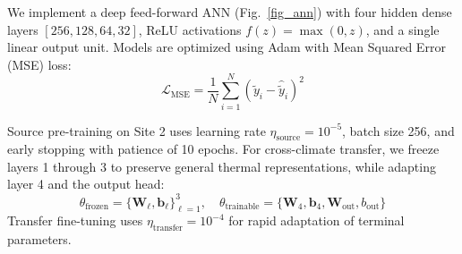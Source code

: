 \documentclass[conference]{IEEEtran}
\begin{document}
We implement a deep feed-forward ANN (Fig.~\ref{fig_ann}) with four hidden dense layers $[256, 128, 64, 32]$, ReLU activations $f(z) = \max(0, z)$, and a single linear output unit. Models are optimized using Adam with Mean Squared Error (MSE) loss:
\begin{equation}
\mathcal{L}_{\text{MSE}} = \frac{1}{N}\sum_{i=1}^{N} (\tilde{y}_i - \hat{\tilde{y}}_i)^2
\label{eq_mse}
\end{equation}

Source pre-training on Site 2 uses learning rate $\eta_{\text{source}} = 10^{-5}$, batch size 256, and early stopping with patience of 10 epochs. For cross-climate transfer, we freeze layers 1 through 3 to preserve general thermal representations, while adapting layer 4 and the output head:
\begin{equation}
\theta_{\text{frozen}} = \{\mathbf{W}_\ell, \mathbf{b}_\ell\}_{\ell=1}^3, \quad \theta_{\text{trainable}} = \{\mathbf{W}_4, \mathbf{b}_4, \mathbf{W}_{\text{out}}, b_{\text{out}}\}
\label{eq_params}
\end{equation}
Transfer fine-tuning uses $\eta_{\text{transfer}} = 10^{-4}$ for rapid adaptation of terminal parameters.

\begin{table}[t]
\caption{Model Hyperparameters and Training Configuration}
\centering
{}
\label{tab_hyperparams}
\end{table}
\end{document}
